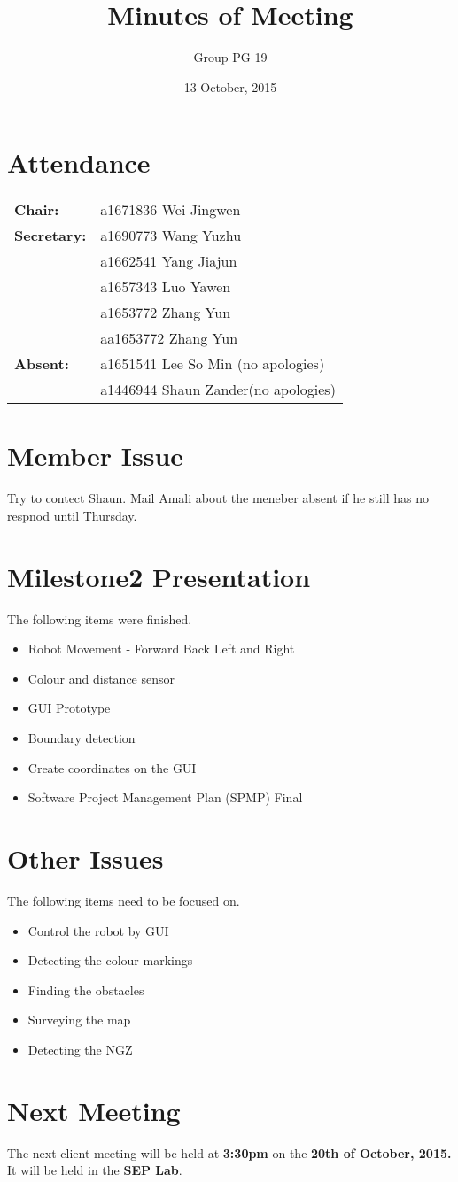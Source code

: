 \documentclass[a4paper]{article}
\title{Minutes of Meeting}
\author{Group PG 19}
\date{13 October, 2015}
\begin{document}
\maketitle
\section*{Attendance}
\begin{tabular}{l l}
\textbf{Chair:} 
&a1671836 Wei Jingwen\\
\textbf{Secretary:}&a1690773 Wang Yuzhu\\
&a1662541 Yang Jiajun\\
&a1657343 Luo Yawen\\
&a1653772 Zhang Yun\\
&aa1653772 Zhang Yun\\
\textbf{Absent:}&a1651541 Lee So Min (no apologies)\\ &a1446944 Shaun Zander(no apologies)
\end{tabular}

\section{Member Issue}
Try to contect Shaun. Mail Amali about the meneber absent if he still has no respnod until Thursday.

\section{Milestone2 Presentation}
The following items were finished.
\begin{itemize}
	\item Robot Movement - Forward Back Left and Right
	\item Colour and distance sensor
	\item GUI Prototype
	\item Boundary detection
	\item Create coordinates on the GUI
	\item Software Project Management Plan (SPMP) Final
\end{itemize}

\section{Other Issues}
The following items need to be focused on.
\begin{itemize}
	\item Control the robot by GUI
	\item Detecting the colour markings
	\item Finding the obstacles
	\item Surveying the map
	\item Detecting the NGZ
\end{itemize}

\section{Next Meeting}
The next client meeting will be held at \textbf{3:30pm} on the \textbf{20th of October, 2015.} It will be held in the \textbf{SEP Lab}.
\end{document}
